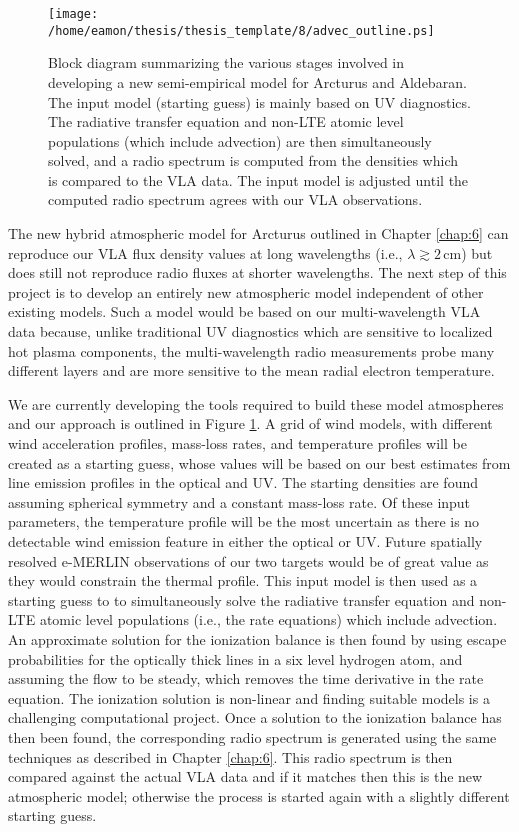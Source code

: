 \begin{figure}[!]
\centering 
        \texttt{[image: /home/eamon/thesis/thesis\_template/8/advec\_outline.ps]}
\caption[Block diagram for a new semi-empirical model]{Block diagram summarizing the various stages involved in developing a new semi-empirical model for Arcturus and Aldebaran. The input model (starting guess) is mainly based on UV diagnostics. The radiative transfer equation and non-LTE atomic level populations (which include advection) are then simultaneously solved, and a radio spectrum is computed from the densities which is compared to the VLA data. The input model is adjusted until the computed radio spectrum agrees with our VLA observations.} 
\label{fig:8.4}
\end{figure}

The new hybrid atmospheric model for Arcturus outlined in Chapter \ref{chap:6} can reproduce our VLA flux density values at long wavelengths (i.e., $\lambda \gtrsim 2\,$cm) but does still not reproduce radio fluxes at shorter wavelengths. The next step of this project is to develop an entirely new atmospheric model independent of other existing models. Such a model would be based on our multi-wavelength VLA data because, unlike traditional UV diagnostics which are sensitive to localized hot plasma components, the multi-wavelength radio measurements probe many different layers and are more sensitive to the mean radial electron temperature.

We are currently developing the tools required to build these model atmospheres and our approach is outlined in Figure \ref{fig:8.4}. A grid of wind models, with different wind acceleration profiles, mass-loss rates, and temperature profiles will be created as a starting guess, whose values will be based on our best estimates from line emission profiles in the optical and UV. The starting densities are found assuming spherical symmetry and a constant mass-loss rate. Of these input parameters, the temperature profile will be the most uncertain as there is no detectable wind emission feature in either the optical or UV. Future spatially resolved e-MERLIN observations of our two targets would be of great value as they would constrain the thermal profile. This input model is then used as a starting guess to to simultaneously solve the radiative transfer equation and non-LTE atomic level populations (i.e., the rate equations) which include advection. An approximate solution for the ionization balance is then found by using escape probabilities for the optically thick lines in a six level hydrogen atom, and assuming the flow to be steady, which removes the time derivative in the rate equation. The ionization solution is non-linear and finding suitable models is a challenging computational project. Once a solution to the ionization balance has then been found, the corresponding radio spectrum is generated using the same techniques as described in Chapter \ref{chap:6}. This radio spectrum is then compared against the actual VLA data and if it matches then this is the new atmospheric model; otherwise the process is started again with a slightly different starting guess.

